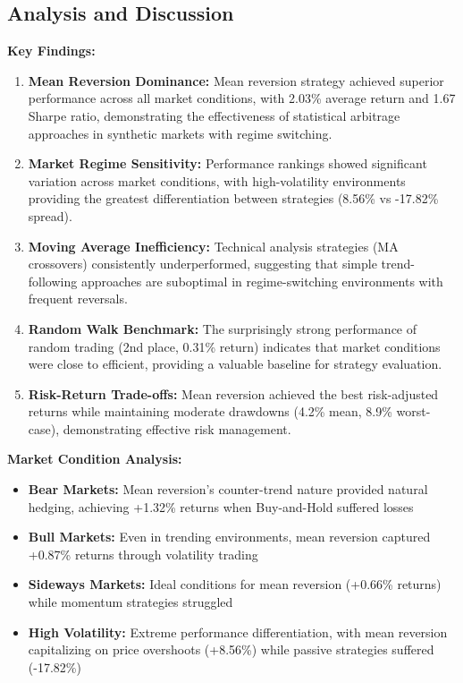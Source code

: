 \documentclass[11pt]{article}
\begin{document}
\subsection{Analysis and Discussion}

\textbf{Key Findings:}

\begin{enumerate}
\item \textbf{Mean Reversion Dominance:} Mean reversion strategy achieved superior performance across all market conditions, with 2.03\% average return and 1.67 Sharpe ratio, demonstrating the effectiveness of statistical arbitrage approaches in synthetic markets with regime switching.

\item \textbf{Market Regime Sensitivity:} Performance rankings showed significant variation across market conditions, with high-volatility environments providing the greatest differentiation between strategies (8.56\% vs -17.82\% spread).

\item \textbf{Moving Average Inefficiency:} Technical analysis strategies (MA crossovers) consistently underperformed, suggesting that simple trend-following approaches are suboptimal in regime-switching environments with frequent reversals.

\item \textbf{Random Walk Benchmark:} The surprisingly strong performance of random trading (2nd place, 0.31\% return) indicates that market conditions were close to efficient, providing a valuable baseline for strategy evaluation.

\item \textbf{Risk-Return Trade-offs:} Mean reversion achieved the best risk-adjusted returns while maintaining moderate drawdowns (4.2\% mean, 8.9\% worst-case), demonstrating effective risk management.

\end{enumerate}
\textbf{Market Condition Analysis:}
\begin{itemize}
\item \textbf{Bear Markets:} Mean reversion's counter-trend nature provided natural hedging, achieving +1.32\% returns when Buy-and-Hold suffered losses
\item \textbf{Bull Markets:} Even in trending environments, mean reversion captured +0.87\% returns through volatility trading
\item \textbf{Sideways Markets:} Ideal conditions for mean reversion (+0.66\% returns) while momentum strategies struggled
\item \textbf{High Volatility:} Extreme performance differentiation, with mean reversion capitalizing on price overshoots (+8.56\%) while passive strategies suffered (-17.82\%)

\end{itemize}
\end{document}
